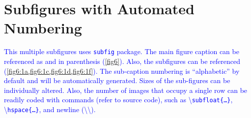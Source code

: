 \documentclass[phd]{ndsu-thesis-2022}
\newcommand\italk[1]{\textcolor{blue}{#1}}  %
\newcommand\cmd[1]{\textbackslash\texttt{#1}}  %
\begin{document}
\section{Subfigures with Automated Numbering}
 \italk{This multiple subfigures uses \texttt{subfig} package. The main figure caption can be referenced as \Cref{fig6} and in parenthesis (\cref{fig6}). Also, the subfigures can be referenced (\cref{fig6:1a,fig6:1c,fig6:1d,fig6:1f}). The sub-caption numbering is ``alphabetic'' by default and will be automatically generated. Sizes of the sub-figures can be individually altered. Also, the number of images that occupy a single row can be readily coded with commands (refer to source code), such as \cmd{subfloat\{\ldots\}}, \cmd{hspace\{\ldots\}}, and newline (\textbackslash\textbackslash).} 
 
\end{document}
